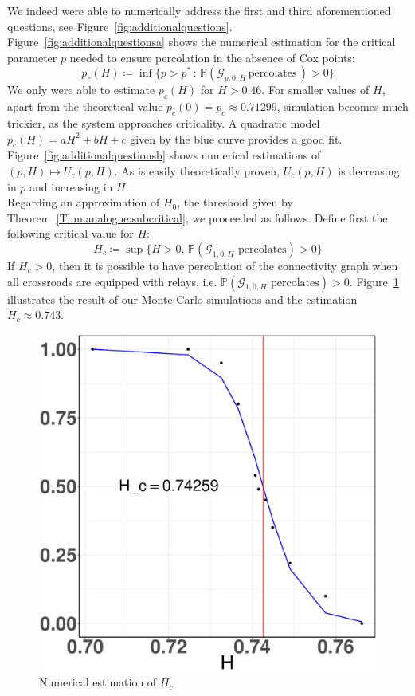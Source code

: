 \documentclass[10pt,a4paper]{amsart}
\theoremstyle{exampstyle}
\theoremstyle{exampnotations}
\begin{document}
We indeed were able to numerically address the first and third aforementioned questions, see Figure~\ref{fig:additionalquestions}. \\
Figure~\ref{fig:additionalquestionsa} shows the numerical estimation for the critical parameter $p$ needed to ensure percolation in the absence of Cox points:
\begin{equation*}
    p_c(H) \coloneqq \inf \lbrace p > p^* \, : \, \mathbb{P}(\mathcal{G}_{p,0,H} \, \text{percolates} \, ) > 0 \rbrace
\end{equation*}
We only were able to estimate $p_c(H)$ for $H>0.46$. For smaller values of $H$, apart from the theoretical value $p_c(0)=p_c \approx 0.71299$, simulation becomes much trickier, as the system approaches criticality. A quadratic model $p_c(H) = aH^2+bH+c$ given by the blue curve provides a good fit. Figure~\ref{fig:additionalquestionsb} shows numerical estimations of $(p,H) \mapsto U_c(p,H)$. As is easily theoretically proven, $U_c(p,H)$ is decreasing in $p$ and increasing in $H$. \\
Regarding an approximation of $H_0$, the threshold given by Theorem~\ref{Thm.analogue:subcritical}, we proceeded as follows. Define first the following critical value for $H$:
\begin{equation*}
    H_c \coloneqq \sup \lbrace H > 0, \, \mathbb{P}(\mathcal{G}_{1,0,H} \text{ percolates}) >0 \rbrace
\end{equation*}
If $H_c > 0$, then it is possible to have percolation of the connectivity graph when all crossroads are equipped with relays, i.e. $\mathbb{P}(\mathcal{G}_{1,0,H} \text{ percolates}) > 0$. Figure~\ref{fig:Hc} illustrates the result of our Monte-Carlo simulations and the estimation  $H_c \approx 0.743$.

\begin{figure}[ht!]
    \centering
    \includegraphics[scale=0.21]{sites-H_c-p=1}
    \caption{Numerical estimation of $H_c$}
    \label{fig:Hc}
\end{figure}
\end{document}
